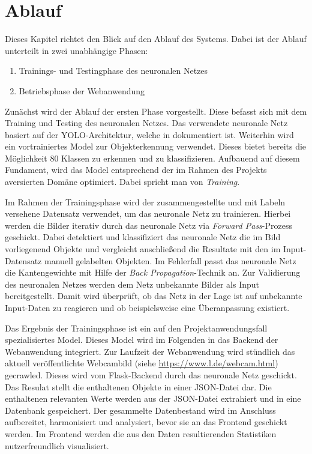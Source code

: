 \section{Ablauf}

Dieses Kapitel richtet den Blick auf den Ablauf des Systems. 
Dabei ist der Ablauf unterteilt in zwei unabhängige Phasen:

\begin{enumerate}
    \item Trainings- und Testingphase des neuronalen Netzes
    \item Betriebsphase der Webanwendung
\end{enumerate}

Zunächst wird der Ablauf der ersten Phase vorgestellt.
Diese befasst sich mit dem Training und Testing des neuronalen Netzes. 
Das verwendete neuronale Netz basiert auf der YOLO-Architektur, welche in \cite{DBLP:journals/corr/RedmonDGF15} dokumentiert ist.
Weiterhin wird ein vortrainiertes Model zur Objekterkennung verwendet.
Dieses bietet bereits die Möglichkeit 80 Klassen zu erkennen und zu klassifizieren. 
Aufbauend auf diesem Fundament, wird das Model entsprechend der im Rahmen des Projekts aversierten Domäne optimiert.
Dabei spricht man von \textit{Training}.

Im Rahmen der Trainingsphase wird der zusammengestellte und mit Labeln versehene Datensatz verwendet, um 
das neuronale Netz zu trainieren. 
Hierbei werden die Bilder iterativ durch das neuronale Netz via \textit{Forward Pass}-Prozess geschickt.
Dabei detektiert und klassifiziert das neuronale Netz die im Bild vorliegenend Objekte und vergleicht anschließend
die Resultate mit den im Input-Datensatz manuell gelabelten Objekten.
Im Fehlerfall passt das neuronale Netz die Kantengewichte mit Hilfe der \textit{Back Propagation}-Technik an.
Zur Validierung des neuronalen Netzes werden dem Netz unbekannte Bilder als Input bereitgestellt.
Damit wird überprüft, ob das Netz in der Lage ist auf unbekannte Input-Daten zu reagieren und ob beispielsweise eine 
Überanpassung existiert.

Das Ergebnis der Trainingsphase ist ein auf den Projektanwendungsfall spezialisiertes Model.
Dieses Model wird im Folgenden in das Backend der Webanwendung integriert.
Zur Laufzeit der Webanwendung wird stündlich das aktuell veröffentlichte Webcambild (siehe \url{https://www.l.de/webcam.html}) gecrawled.
Dieses wird vom Flask-Backend durch das neuronale Netz geschickt. 
Das Resulat stellt die enthaltenen Objekte in einer JSON-Datei dar. 
Die enthaltenen relevanten Werte werden aus der JSON-Datei extrahiert und in eine Datenbank gespeichert.
Der gesammelte Datenbestand wird im Anschluss aufbereitet, harmonisiert und analysiert, bevor sie an das Frontend
geschickt werden.
Im Frontend werden die aus den Daten resultierenden Statistiken nutzerfreundlich visualisiert.
